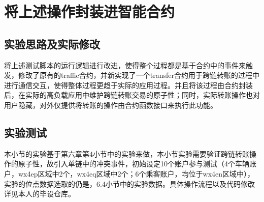 \section{将上述操作封装进智能合约}

\subsection{实验思路及实际修改}

将上述测试脚本的运行逻辑进行改进，使得整个过程都是基于合约中的事件来触发，修改了原有的traffic合约，并新实现了一个transfer合约用于跨链转账的过程中进行通信交互，使得整体过程更趋于实际的应用过程。并且将该过程由合约封装后，在实际的高负载应用中维护跨链转账交易的原子性；同时，实际转账操作也对用户隐藏，对外仅提供将转账的操作由合约函数接口来执行此功能。







\subsection{实验测试}

本小节的实验基于第六章第4小节中的实验来做，本小节实验需要验证跨链转账操作的原子性，故引入单链中的冲突事件，初始设定10个账户参与测试（4个车辆账户，wx4ep区域中2个，wx4eq区域中2个；6个乘客账户，均位于wx4en区域中），实验的位点数据选取的仍是，6.4小节中的实验数据。具体操作流程以及代码修改详见本人的毕设仓库。

